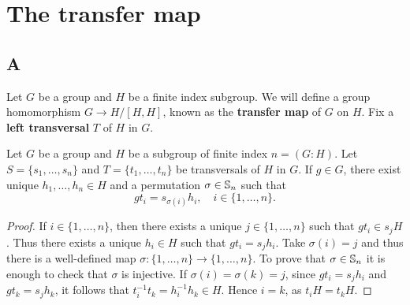 \chapter{The transfer map}
\label{transfer}


\section*{A}

Let $G$ be a group and $H$ be a finite index subgroup. We will define
a group homomorphism $G\to H/[H,H]$, known as the \textbf{transfer map} of $G$
on $H$. Fix a \textbf{left transversal} $T$ of $H$ in $G$.

\begin{lemma}
	\label{lem:sigma}
	Let $G$ be a group and $H$ be a subgroup of finite index $n=(G:H)$. Let
	$S=\{s_1,\dots,s_n\}$ and $T=\{t_1,\dots,t_n\}$ be transversals of $H$ in $G$.
	If $g\in G$, there exist unique $h_1,\dots,h_n\in H$ and a permutation 
	$\sigma\in\mathbb{S}_n$  
	such that
		\[
		gt_i=s_{\sigma(i)}h_i,\quad
		i\in\{1,\dots,n\}.
	\]
\end{lemma}

\begin{proof}
	If $i\in\{1,\dots,n\}$, then there exists a unique $j\in\{1,\dots,n\}$ such that $gt_i\in
	s_jH$. Thus there exists a unique $h_i\in H$ such that $gt_i=s_jh_i$. Take 
	$\sigma(i)=j$ and thus there is a well-defined map 
	$\sigma\colon\{1,\dots,n\}\to\{1,\dots,n\}$.  To prove that 
	$\sigma\in\mathbb{S}_n$ it is enough to check that $\sigma$ is injective. If
	$\sigma(i)=\sigma(k)=j$, since $gt_i=s_jh_i$ and $gt_k=s_jh_k$, it follows that 
	$t_i^{-1}t_k=h_i^{-1}h_k\in H$. Hence $i=k$, as $t_iH=t_kH$.
\end{proof}

%
%
%


